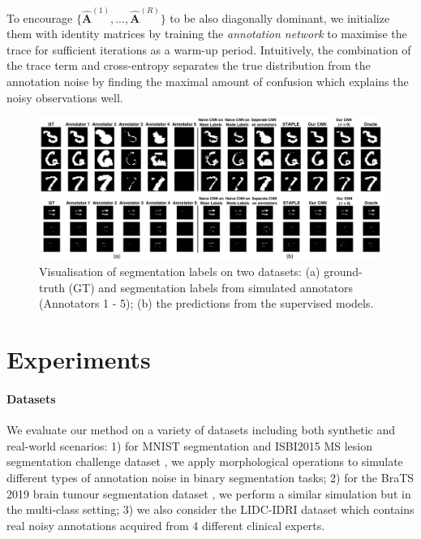 To encourage $\{\hat{\mathbf{A}}^{(1)}, ..., \hat{\mathbf{A}}^{(R)}\}$ to be also diagonally dominant, we initialize them with identity matrices by training the \textit{annotation network} to maximise the trace for sufficient iterations as a warm-up period. Intuitively, the combination of the trace term and cross-entropy separates the true distribution from the annotation noise by finding the maximal amount of confusion which explains the noisy observations well. 

\begin{figure}[t]
    \centering
    \vspace{-5mm}
    \includegraphics[width=\linewidth]{chapter_8_neurips/picture11.png}
    \vspace{-3mm}
    \caption{\footnotesize Visualisation of segmentation labels on two datasets: (a) ground-truth (GT) and segmentation labels from simulated annotators (Annotators 1 - 5); (b) the predictions from the supervised models.}
    \label{MNIST and MS segmentation results}
    \vspace{-2mm}
\end{figure}


\section{Experiments}

\paragraph{Datasets}
We evaluate our method on a variety of datasets including both synthetic and real-world scenarios: 1) for MNIST segmentation and ISBI2015 MS lesion segmentation challenge dataset \cite{jesson2015hierarchical}, we apply morphological operations to simulate different types of annotation noise in binary segmentation tasks; 2) for the BraTS 2019 brain tumour segmentation dataset \cite{menze2014multimodal}, we perform a similar simulation but in the multi-class setting; 3) we also consider the LIDC-IDRI dataset which contains real noisy annotations acquired from 4 different clinical experts. 

